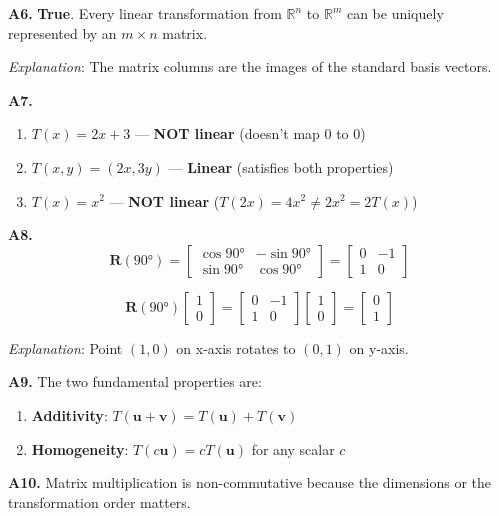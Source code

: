 \documentclass[12pt,a4paper]{article}
\theoremstyle{definition}
\begin{document}
\textbf{A6.} \textbf{True}. Every linear transformation from $\mathbb{R}^n$ to $\mathbb{R}^m$ can be uniquely represented by an $m \times n$ matrix.

\textit{Explanation}: The matrix columns are the images of the standard basis vectors.

\textbf{A7.}
\begin{enumerate}[label=(\alph*)]
\item $T(x) = 2x + 3$ — \textbf{NOT linear} (doesn't map 0 to 0)
\item $T(x, y) = (2x, 3y)$ — \textbf{Linear} (satisfies both properties)
\item $T(x) = x^2$ — \textbf{NOT linear} ($T(2x) = 4x^2 \neq 2x^2 = 2T(x)$)
\end{enumerate}

\textbf{A8.}
\[
\mathbf{R}(90°) = \begin{bmatrix} \cos 90° & -\sin 90° \\ \sin 90° & \cos 90° \end{bmatrix} = \begin{bmatrix} 0 & -1 \\ 1 & 0 \end{bmatrix}
\]

\[
\mathbf{R}(90°)\begin{bmatrix} 1 \\ 0 \end{bmatrix} = \begin{bmatrix} 0 & -1 \\ 1 & 0 \end{bmatrix} \begin{bmatrix} 1 \\ 0 \end{bmatrix} = \begin{bmatrix} 0 \\ 1 \end{bmatrix}
\]

\textit{Explanation}: Point $(1, 0)$ on x-axis rotates to $(0, 1)$ on y-axis.

\textbf{A9.} The two fundamental properties are:
\begin{enumerate}
\item \textbf{Additivity}: $T(\mathbf{u} + \mathbf{v}) = T(\mathbf{u}) + T(\mathbf{v})$
\item \textbf{Homogeneity}: $T(c\mathbf{u}) = cT(\mathbf{u})$ for any scalar $c$
\end{enumerate}

\textbf{A10.} Matrix multiplication is non-commutative because the dimensions or the transformation order matters.
\end{document}
